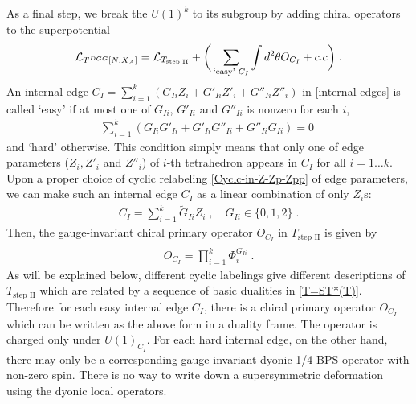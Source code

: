 \documentclass[a4paper,11pt]{article}
\begin{document}
As a final step, we break the $U(1)^k$ to its subgroup by adding chiral operators 
to the superpotential 
%
\begin{align}
\mathcal{L}_{T^{DGG}[N,X_A]} = \mathcal{L}_{T_{\textrm{step II}}}+\bigg{(} \sum_{\textrm{`easy' $C_I$}}\int d^2 \theta  O_{C_I}+c.c \bigg{)}\;. \label{DGG : final}
\end{align}
%
An internal edge $C_I = \sum_{i=1}^k (G_{Ii}Z_i +G'_{Ii}Z'_i+G''_{Ii}Z''_i)$ in  \eqref{internal edges} is called `easy' \cite{Dimofte:2011ju} 
if at most one of $G_{Ii}$, $G'_{Ii}$ and $G''_{Ii}$ is nonzero for each $i$,
%
\begin{align}
\sum_{i=1}^k (G_{Ii}G'_{Ii}+G'_{Ii} G''_{Ii}+G''_{Ii}G_{Ii}) = 0\;
\end{align}
%
and `hard' otherwise. 
This condition simply means that only one of edge parameters ($Z_i,Z'_i$ and $Z''_i$) of $i$-th tetrahedron appears in $C_I$ for all $i=1\ldots k$. Upon a proper choice of cyclic relabeling \eqref{Cyclc-in-Z-Zp-Zpp} of edge parameters, we can  make such an internal edge $C_I$ as a linear combination of only $Z_i$s: 
%
\begin{align}
C_I = \sum_{i=1}^k \widetilde{G}_{Ii}Z_i\;, \quad G_{Ii}\in \{ 0, 1, 2\}\;.
\end{align}
%
Then, the gauge-invariant chiral primary operator $O_{C_I}$ in $T_{\textrm{step II}}$ is given by
%
\begin{align}
O_{C_I} = \prod_{i=1}^k \Phi_i^{\widetilde{G}_{Ii}}\;.
\end{align}
%
As will be explained below, different cyclic labelings  give different descriptions of $T_{\textrm{step II}}$ which are related by a sequence of basic dualities in \eqref{T=ST*(T)}. Therefore for each easy internal edge $C_I$, there is a chiral primary operator  $O_{C_I}$ which can be written as the above form in a  duality frame.  The operator is  charged only under $U(1)_{C_I}$. For each hard internal edge, on the other hand, there may only be a corresponding gauge invariant dyonic 1/4 BPS operator with non-zero spin.  There is no way to write down a supersymmetric deformation using the dyonic local operators. 
%
\end{document}
